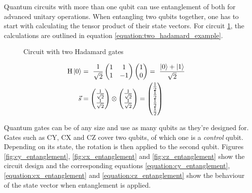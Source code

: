Quantum circuits with more than one qubit can use entanglement of both for advanced unitary operations. When entangling two qubits together, one has to start with calculating the tensor product of their state vectors. For circuit \ref{fig:circuit_double_hadamard}, the calculations are outlined in equation \ref{equation:two_hadamard_example}.

\begin{figure}[!h]
    \centering
    \caption{Circuit with two Hadamard gates}
    \label{fig:circuit_double_hadamard}
\end{figure}

\begin{equation}
    \centering
    \begin{split}
        \mathrm{H}\ket{0} &=\ \frac{1}{\sqrt{2}}\begin{pmatrix}1 & 1 \\1 & -1\end{pmatrix}\begin{pmatrix}1 \\ 0\end{pmatrix} =\ \frac{\ket{0} + \ket{1}}{\sqrt{2}} \\
        \vec{s} &= \begin{pmatrix}\frac{1}{\sqrt{2}}\\\frac{1}{\sqrt{2}}\end{pmatrix} \otimes \begin{pmatrix}\frac{1}{\sqrt{2}}\\\frac{1}{\sqrt{2}}\end{pmatrix} = \begin{pmatrix}
            \frac{1}{2}\\\frac{1}{2}\\\frac{1}{2}\\\frac{1}{2}
        \end{pmatrix}
    \end{split}
    \label{equation:two_hadamard_example}
\end{equation}

\newpage
Quantum gates can be of any size and use as many qubits as they're designed for. Gates such as $\mathrm{CY}$\cite{qiskit_cygate_nodate}, $\mathrm{CX}$\cite{qiskit_cxgate_nodate} and $\mathrm{CZ}$\cite{qiskit_czgate_nodate} cover two qubits, of which one is a \emph{control} qubit. Depending on its state, the rotation is then applied to the second qubit. Figures \ref{fig:cy_entanglement}, \ref{fig:cx_entanglement} and \ref{fig:cz_entanglement} show the circuit design and the corresponding equations \ref{equation:cy_entanglement}, \ref{equation:cx_entanglement} and \ref{equation:cz_entanglement} show the behaviour of the state vector when entanglement is applied.

